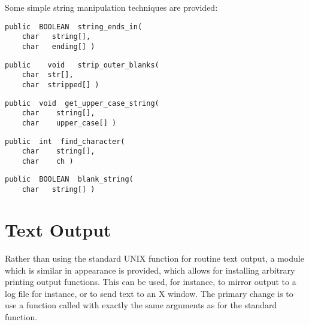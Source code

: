 Some simple string manipulation techniques are provided:

{\bf\begin{verbatim}
public  BOOLEAN  string_ends_in(
    char   string[],
    char   ending[] )
\end{verbatim}}


{\bf\begin{verbatim}
public    void   strip_outer_blanks(
    char  str[],
    char  stripped[] )
\end{verbatim}}


{\bf\begin{verbatim}
public  void  get_upper_case_string(
    char    string[],
    char    upper_case[] )
\end{verbatim}}


{\bf\begin{verbatim}
public  int  find_character(
    char    string[],
    char    ch )
\end{verbatim}}


{\bf\begin{verbatim}
public  BOOLEAN  blank_string(
    char   string[] )
\end{verbatim}}


\section{Text Output}

Rather than using the standard UNIX function  for routine
text output, a module which is similar in appearance is provided,
which allows for installing arbitrary printing output functions.  This
can be used, for instance, to mirror output to a log file for
instance, or to send text to an X window.  The primary change is to
use a function called  with exactly the same arguments as
for the standard  function.

